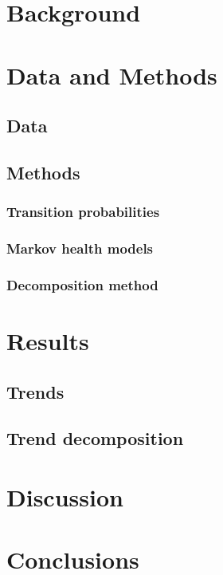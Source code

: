 \begin{abstract}
\end{abstract}

\section{Background}
\section{Data and Methods}
\subsection{Data}
\subsection{Methods}
\subsubsection{Transition probabilities}
\subsubsection{Markov health models}
\subsubsection{Decomposition method}
\section{Results}
\subsection{Trends}
\subsection{Trend decomposition}
\section{Discussion}
\section{Conclusions}


  

